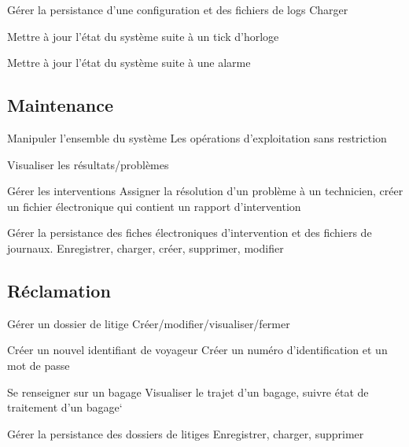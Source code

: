 \nBesoin
{Gérer la persistance d'une configuration et des fichiers de logs}
{}
{Charger}

\nBesoin
{Mettre à jour l'état du système suite à un tick d'horloge}
{}{}

\nBesoin
{Mettre à jour l'état du système suite à une alarme}
{}{}

\subsection{Maintenance}
\setcounter{cntBesoins}{1}

\nBesoin
{Manipuler l'ensemble du système}
{}
{Les opérations d'exploitation sans restriction}

\nBesoin
{Visualiser les résultats/problèmes}
{}{}

\nBesoin
{Gérer les interventions}
{}
{Assigner la résolution d'un problème à un technicien, créer un fichier électronique qui contient un rapport d'intervention}

\nBesoin
{Gérer la persistance des fiches électroniques d'intervention et des fichiers de journaux.}
{}
{Enregistrer, charger, créer, supprimer, modifier}

\subsection{Réclamation}
\setcounter{cntBesoins}{1}

\nBesoin
{Gérer un dossier de  litige}
{}
{Créer/modifier/visualiser/fermer}

\nBesoin
{Créer un nouvel identifiant de voyageur}
{}
{Créer un numéro d'identification et un mot de passe}

\nBesoin
{Se renseigner sur un bagage}
{}
{Visualiser le trajet d'un bagage,  suivre état de traitement d'un bagage}`

\nBesoin
{Gérer la persistance des dossiers de litiges}
{}
{Enregistrer, charger, supprimer}
